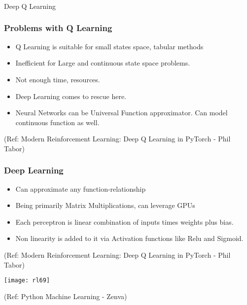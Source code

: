 \begin{frame}[fragile]\frametitle{}
\begin{center}
{\Large Deep Q Learning}
\end{center}
\end{frame}

\begin{frame}[fragile]\frametitle{Problems with Q Learning}


\begin{itemize}
\item Q Learning is suitable for small states space, tabular methods
\item Inefficient for Large and continuous state space problems.
\item Not enough time, resources.
\item Deep Learning comes to rescue here.
\item Neural Networks can be Universal Function approximator. Can model continuous function as well.
\end{itemize}

{\tiny (Ref: Modern Reinforcement Learning: Deep Q Learning in PyTorch - Phil Tabor)}

\end{frame}

\begin{frame}[fragile]\frametitle{Deep Learning}


\begin{itemize}
\item Can approximate any function-relationship
\item Being primarily Matrix Multiplications, can leverage GPUs
\item Each perceptron is linear combination of inputs times weights plus bias.
\item Non linearity is added to it via Activation functions like Relu and Sigmoid.
\end{itemize}

{\tiny (Ref: Modern Reinforcement Learning: Deep Q Learning in PyTorch - Phil Tabor)}

\begin{center}
\texttt{[image: rl69]}

{\tiny (Ref: Python Machine Learning - Zenva)}
\end{center}

\end{frame}

